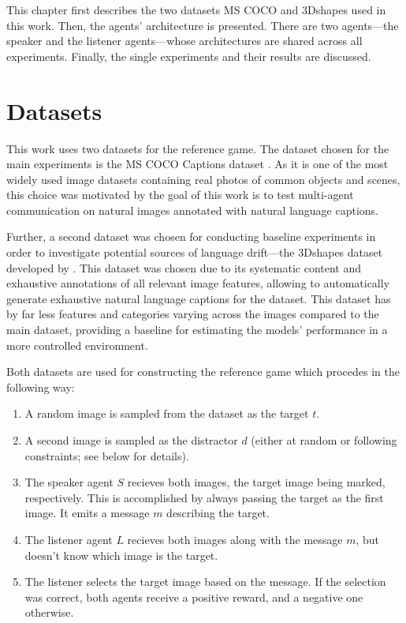 This chapter first describes the two datasets MS COCO and 3Dshapes used in this work. Then, the agents' architecture is presented. There are two agents---the speaker and the listener agents---whose architectures are shared across all experiments. Finally, the single experiments and their results are discussed.

\section{Datasets}

This work uses two datasets for the reference game. The dataset chosen for the main experiments is the MS COCO Captions dataset \parencite{chen2015microsoft}. As it is one of the most widely used image datasets containing real photos of common objects and scenes, this choice was motivated by the goal of this work is to test multi-agent communication on natural images annotated with natural language captions. 

Further, a second dataset was chosen for conducting baseline experiments in order to investigate potential sources of language drift---the 3Dshapes dataset developed by \textcite{burgess20183d}. This dataset was chosen due to its systematic content and exhaustive annotations of all relevant image features, allowing to automatically generate exhaustive natural language captions for the dataset. This dataset has by far less features and categories varying across the images compared to the main dataset, providing a baseline for estimating the models' performance in a more controlled environment.

Both datasets are used for constructing the reference game which procedes in the following way:
\begin{enumerate}
	\item A random image is sampled from the dataset as the target $t$.
	\item A second image is sampled as the distractor $d$ (either at random or following constraints; see below for details).
	\item The speaker agent $S$ recieves both images, the target image being marked, respectively. This is accomplished by always passing the target as the first image. It emits a message $m$ describing the target.
	\item The listener agent $L$ recieves both images along with the message $m$, but doesn't know which image is the target.
	\item The listener selects the target image based on the message. If the selection was correct, both agents receive a positive reward, and a negative one otherwise.	 
\end{enumerate}

